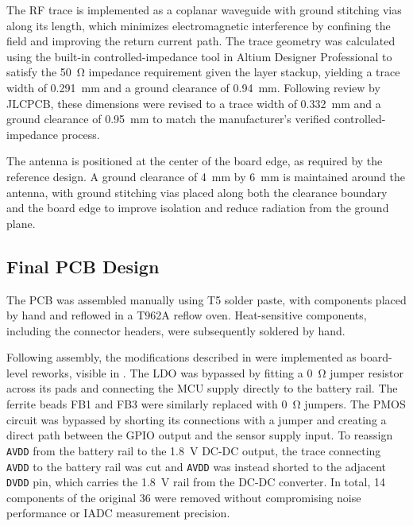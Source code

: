 The RF trace is implemented as a coplanar waveguide with ground stitching vias along its length, which minimizes electromagnetic interference by confining the field and improving the return current path. The trace geometry was calculated using the built-in controlled-impedance tool in Altium Designer Professional to satisfy the \SI{50}{\ohm} impedance requirement given the layer stackup, yielding a trace width of \SI{0.291}{\milli\meter} and a ground clearance of \SI{0.94}{\milli\meter}. Following review by JLCPCB, these dimensions were revised to a trace width of \SI{0.332}{\milli\meter} and a ground clearance of \SI{0.95}{\milli\meter} to match the manufacturer's verified controlled-impedance process.
 
The antenna is positioned at the center of the board edge, as required by the reference design. A ground clearance of \SI{4}{\milli\meter} by \SI{6}{\milli\meter} is maintained around the antenna, with ground stitching vias placed along both the clearance boundary and the board edge to improve isolation and reduce radiation from the ground plane.

\subsection{Final PCB Design} \label{sec:final_pcb}
The PCB was assembled manually using T5 solder paste, with components placed by hand and reflowed in a T962A reflow oven. Heat-sensitive components, including the connector headers, were subsequently soldered by hand.
 
Following assembly, the modifications described in  were implemented as board-level reworks, visible in . The LDO was bypassed by fitting a \SI{0}{\ohm} jumper resistor across its pads and connecting the MCU supply directly to the battery rail. The ferrite beads FB1 and FB3 were similarly replaced with \SI{0}{\ohm} jumpers. The PMOS circuit was bypassed by shorting its connections with a jumper and creating a direct path between the GPIO output and the sensor supply input. To reassign \texttt{AVDD} from the battery rail to the \SI{1.8}{\volt} DC-DC output, the trace connecting \texttt{AVDD} to the battery rail was cut and \texttt{AVDD} was instead shorted to the adjacent \texttt{DVDD} pin, which carries the \SI{1.8}{\volt} rail from the DC-DC converter. In total, 14 components of the original 36 were removed without compromising noise performance or IADC measurement precision.

